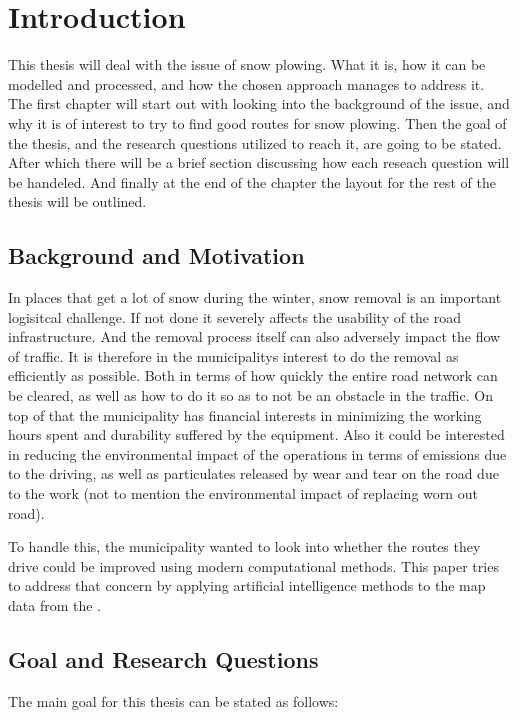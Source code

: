 \chapter{Introduction}

This thesis will deal with the issue of snow plowing. What it is, how it can be modelled and processed, and how the chosen approach manages to address it. The first chapter will start out with looking into the background of the issue, and why it is of interest to try to find good routes for snow plowing. Then the goal of the thesis, and the research questions utilized to reach it, are going to be stated. After which there will be a brief section discussing how each reseach question will be handeled. And finally at the end of the chapter the layout for the rest of the thesis will be outlined.

\section{Background and Motivation}

In places that get a lot of snow during the winter, snow removal is an important logisitcal challenge. If not done it severely affects the usability of the road infrastructure. And the removal process itself can also adversely impact the flow of traffic. It is therefore in the municipalitys interest to do the removal as efficiently as possible. Both in terms of how quickly the entire road network can be cleared, as well as how to do it so as to not be an obstacle in the traffic. On top of that the municipality has financial interests in minimizing the working hours spent and durability suffered by the equipment. Also it could be interested in reducing the environmental impact of the operations in terms of emissions due to the driving, as well as particulates released by wear and tear on the road due to the work (not to mention the environmental impact of replacing worn out road).

To handle this, the municipality wanted to look into whether the routes they drive could be improved using modern computational methods. This paper tries to address that concern by applying artificial intelligence methods to the map data from the .

\section{Goal and Research Questions}

The main goal for this thesis can be stated as follows:

